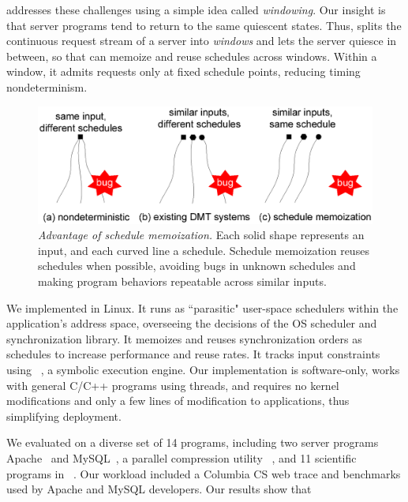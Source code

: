 \tern addresses these challenges using a simple idea called
\emph{windowing}.  Our insight is that server programs tend to return to the
same quiescent states. Thus, \tern splits the continuous request stream of a
server into \emph{windows} and lets the server quiesce in between, so that \tern
can memoize and reuse schedules across windows.  Within a window, it admits
requests only at fixed schedule points, reducing timing nondeterminism.

\begin{figure}[t]
\centering
\includegraphics[width=.5\textwidth]{tern/figures/idea.eps}
\caption{\small{\em Advantage of schedule memoization.}  Each solid shape
  represents an input, and each curved line a schedule.  Schedule
  memoization reuses schedules when possible, avoiding bugs in unknown
  schedules and making program behaviors repeatable across similar
  inputs.}
\label{fig:idea}
\end{figure}%


We implemented \tern in Linux.  It runs as ``parasitic"
user-space schedulers within the application's address space, overseeing
the decisions of the OS scheduler and synchronization library.  It
memoizes and reuses synchronization orders as schedules to increase
performance and reuse rates. It tracks input constraints using
\klee~\cite{klee:osdi08}, a symbolic execution engine.  Our implementation
is software-only, works with general C/C++ programs using threads, and
requires no kernel modifications and only a few lines of modification to
applications, thus simplifying deployment.

We evaluated \tern on a diverse set of 14 programs, including two server
programs Apache~\cite{apache} and MySQL~\cite{mysql}, a parallel
compression utility \pbzip~\cite{pbzip2}, and 11 scientific programs in
\splash~\cite{splash2}.  Our workload included a Columbia CS web trace and
benchmarks used by Apache and MySQL developers.  Our results show that

